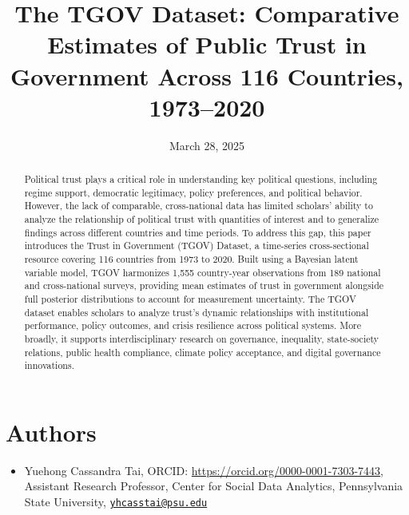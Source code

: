 \documentclass[
  12pt,
]{article}
\title{The TGOV Dataset: Comparative Estimates of Public Trust in Government Across 116 Countries, 1973--2020}
\author{}
\date{\vspace{-2.5em}March 28, 2025}
\providecommand{\tightlist}{%
  \setlength{\itemsep}{0pt}\setlength{\parskip}{0pt}}
\begin{document}
\maketitle


\section*{Authors}\label{authors}

\begin{itemize}
\tightlist
\item
  Yuehong Cassandra Tai, ORCID: \url{https://orcid.org/0000-0001-7303-7443}, Assistant Research Professor, Center for Social Data Analytics, Pennsylvania State University, \href{mailto:yhcasstai@psu.edu}{\nolinkurl{yhcasstai@psu.edu}}
\end{itemize}

\pagebreak

\renewcommand{\baselinestretch}{1}
\selectfont
\maketitle
\renewcommand{\baselinestretch}{1.5}
\selectfont

\begin{abstract}
Political trust plays a critical role in understanding key political questions, including regime support, democratic legitimacy, policy preferences, and political behavior. However, the lack of comparable, cross-national data has limited scholars' ability to analyze the relationship of political trust with quantities of interest and to generalize findings across different countries and time periods. To address this gap, this paper introduces the Trust in Government (TGOV) Dataset, a time-series cross-sectional resource covering 116 countries from 1973 to 2020. Built using a Bayesian latent variable model, TGOV harmonizes 1,555 country-year observations from 189 national and cross-national surveys, providing mean estimates of trust in government alongside full posterior distributions to account for measurement uncertainty. The TGOV dataset enables scholars to analyze trust’s dynamic relationships with institutional performance, policy outcomes, and crisis resilience across political systems. More broadly, it supports interdisciplinary research on governance, inequality, state-society relations, public health compliance, climate policy acceptance, and digital governance innovations.

\end{abstract}
\end{document}
